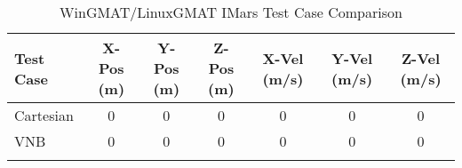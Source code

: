 \begin{table}[htbp!]
\centering
\caption{ WinGMAT/LinuxGMAT IMars Test Case Comparison}
      \begin{tabular}{lcccccc}
      \hline\hline
          Test Case & X-Pos (m) & Y-Pos (m) & Z-Pos (m) & X-Vel (m/s) & Y-Vel (m/s) & Z-Vel (m/s) \\
         \hline
         Cartesian & 0 & 0 & 0 & 0 & 0 & 0 \\
         VNB & 0 & 0 & 0 & 0 & 0 & 0 \\
      \hline\hline
      \label{Table: IMars WinGMAT-LinuxGMAT Table} 
\end{tabular}
\end{table}
